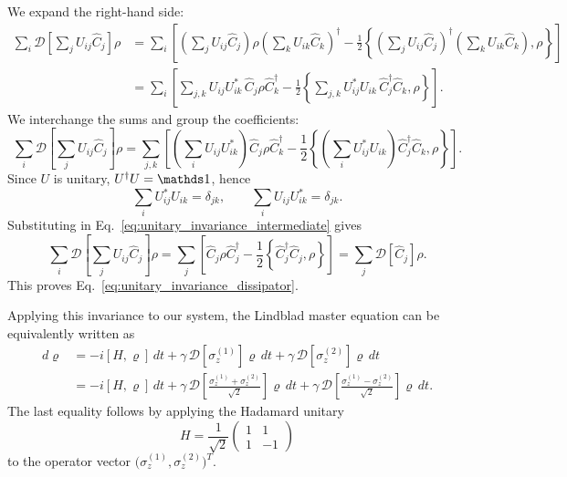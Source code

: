 We expand the right-hand side:
\begin{align}
	\sum_i \mathcal{D}\!\left[\sum_j U_{ij}\hat C_j\right]\rho
	&=
	\sum_i
	\left[
	\left(\sum_j U_{ij}\hat C_j\right)\rho
	\left(\sum_k U_{ik}\hat C_k\right)^\dagger
	-
	\frac{1}{2}
	\left\{
	\left(\sum_j U_{ij}\hat C_j\right)^\dagger
	\left(\sum_k U_{ik}\hat C_k\right),
	\rho
	\right\}
	\right]\nonumber\\
	&=
	\sum_i
	\left[
	\sum_{j,k}U_{ij}U_{ik}^*\,\hat C_j\rho \hat C_k^\dagger
	-
	\frac{1}{2}
	\left\{
	\sum_{j,k}U_{ij}^*U_{ik}\,\hat C_j^\dagger \hat C_k,
	\rho
	\right\}
	\right].
\end{align}
We interchange the sums and group the coefficients:
\begin{equation}
	\sum_i \mathcal{D}\!\left[\sum_j U_{ij}\hat C_j\right]\rho
	=
	\sum_{j,k}
	\left[
	\left(\sum_i U_{ij}U_{ik}^*\right)\hat C_j\rho \hat C_k^\dagger
	-
	\frac{1}{2}
	\left\{
	\left(\sum_i U_{ij}^*U_{ik}\right)\hat C_j^\dagger \hat C_k,
	\rho
	\right\}
	\right].
	\label{eq:unitary_invariance_intermediate}
\end{equation}
Since $U$ is unitary, $U^\dagger U=\id$, hence
\begin{equation}
	\sum_i U_{ij}^*U_{ik}=\delta_{jk},
	\qquad
	\sum_i U_{ij}U_{ik}^*=\delta_{jk}.
\end{equation}
Substituting in Eq.~\eqref{eq:unitary_invariance_intermediate} gives
\begin{equation}
	\sum_i \mathcal{D}\!\left[\sum_j U_{ij}\hat C_j\right]\rho
	=
	\sum_j
	\left[
	\hat C_j\rho \hat C_j^\dagger
	-
	\frac{1}{2}
	\left\{
	\hat C_j^\dagger \hat C_j,
	\rho
	\right\}
	\right]
	=
	\sum_j \mathcal{D}[\hat C_j]\rho.
\end{equation}
This proves Eq.~\eqref{eq:unitary_invariance_dissipator}.

Applying this invariance to our system, the Lindblad master equation can be equivalently written as
\begin{align}
	d\varrho
	&=
	-i[H,\varrho]\,dt
	+\gamma\,\mathcal{D}\!\left[\sigma_z^{(1)}\right]\varrho\,dt
	+\gamma\,\mathcal{D}\!\left[\sigma_z^{(2)}\right]\varrho\,dt
	\nonumber\\
	&=
	-i[H,\varrho]\,dt
	+\gamma\,\mathcal{D}\!\left[\frac{\sigma_z^{(1)}+\sigma_z^{(2)}}{\sqrt{2}}\right]\varrho\,dt
	+\gamma\,\mathcal{D}\!\left[\frac{\sigma_z^{(1)}-\sigma_z^{(2)}}{\sqrt{2}}\right]\varrho\,dt.
\end{align}
The last equality follows by applying the Hadamard unitary
\begin{equation}
	H=\frac{1}{\sqrt{2}}
	\begin{pmatrix}
		1 & 1\\
		1 & -1
	\end{pmatrix}
\end{equation}
to the operator vector $\big(\sigma_z^{(1)},\sigma_z^{(2)}\big)^{T}$.

